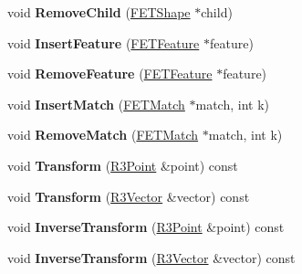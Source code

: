 \begin{DoxyCompactItemize}
\item 
void {\bfseries Remove\+Child} (\hyperlink{struct_f_e_t_shape}{F\+E\+T\+Shape} $\ast$child)\hypertarget{struct_f_e_t_shape_a1d7e0855cca8f45e57a34f14bc80e691}{}\label{struct_f_e_t_shape_a1d7e0855cca8f45e57a34f14bc80e691}

\item 
void {\bfseries Insert\+Feature} (\hyperlink{struct_f_e_t_feature}{F\+E\+T\+Feature} $\ast$feature)\hypertarget{struct_f_e_t_shape_aee92f072cbd910ba5b9fdda43abf0d01}{}\label{struct_f_e_t_shape_aee92f072cbd910ba5b9fdda43abf0d01}

\item 
void {\bfseries Remove\+Feature} (\hyperlink{struct_f_e_t_feature}{F\+E\+T\+Feature} $\ast$feature)\hypertarget{struct_f_e_t_shape_adf4959e8303d886919d3fc26914447b6}{}\label{struct_f_e_t_shape_adf4959e8303d886919d3fc26914447b6}

\item 
void {\bfseries Insert\+Match} (\hyperlink{struct_f_e_t_match}{F\+E\+T\+Match} $\ast$match, int k)\hypertarget{struct_f_e_t_shape_a9587ab8257ad5b9698488165ba8c2cc3}{}\label{struct_f_e_t_shape_a9587ab8257ad5b9698488165ba8c2cc3}

\item 
void {\bfseries Remove\+Match} (\hyperlink{struct_f_e_t_match}{F\+E\+T\+Match} $\ast$match, int k)\hypertarget{struct_f_e_t_shape_a0f8169a310bf07b056b0134f82616ab6}{}\label{struct_f_e_t_shape_a0f8169a310bf07b056b0134f82616ab6}

\item 
void {\bfseries Transform} (\hyperlink{class_r3_point}{R3\+Point} \&point) const \hypertarget{struct_f_e_t_shape_aac09de92c52e701142f0606cdaee2e04}{}\label{struct_f_e_t_shape_aac09de92c52e701142f0606cdaee2e04}

\item 
void {\bfseries Transform} (\hyperlink{class_r3_vector}{R3\+Vector} \&vector) const \hypertarget{struct_f_e_t_shape_a3373a648a9715f38d9c27d8dd9400906}{}\label{struct_f_e_t_shape_a3373a648a9715f38d9c27d8dd9400906}

\item 
void {\bfseries Inverse\+Transform} (\hyperlink{class_r3_point}{R3\+Point} \&point) const \hypertarget{struct_f_e_t_shape_ac6b371a7ec8e5f302b08860a244dbbbe}{}\label{struct_f_e_t_shape_ac6b371a7ec8e5f302b08860a244dbbbe}

\item 
void {\bfseries Inverse\+Transform} (\hyperlink{class_r3_vector}{R3\+Vector} \&vector) const \hypertarget{struct_f_e_t_shape_a7950c839bd4d8bb29a0f42d6b3036e25}{}\label{struct_f_e_t_shape_a7950c839bd4d8bb29a0f42d6b3036e25}


\end{DoxyCompactItemize}
